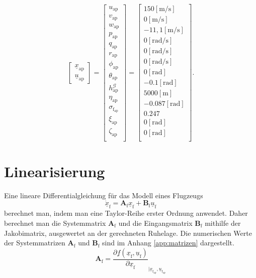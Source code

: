 \begin{equation}
\begin{bmatrix}
\underline{x}_\mathrm{ap} \\ \underline{u}_\mathrm{ap} 
\end{bmatrix} = 
\begin{bmatrix} 
u_\mathrm{ap}\\v_\mathrm{ap}\\w_\mathrm{ap}\\p_\mathrm{ap}\\q_\mathrm{ap}\\r_\mathrm{ap}\\\phi_\mathrm{ap}\\\theta_\mathrm{ap}\\h^\mathcal{G}_\mathrm{ap}\\ \eta_\mathrm{ap}\\ \sigma_{\mathrm{f_{ap}}}\\ \xi_\mathrm{ap} \\ \zeta_\mathrm{ap}\\
\end{bmatrix} =  \begin{bmatrix} 
150 \mathrm{ [m/s]}\\0 \mathrm{[ m/s]}\\-11,1 \mathrm{[m/s]}\\0 \mathrm{[ rad/s]}\\0 \mathrm{ [rad/s]}\\0 \mathrm{ [rad/s]}\\0 \mathrm{ [rad]}\\-0.1 \mathrm{[ rad]}\\5000 \mathrm{[ m]}\\-0.087 \mathrm{[ rad]}\\0.247 \\0 \mathrm{[ rad]}\\0 \mathrm{[ rad]}\\
\end{bmatrix}.
\end{equation}


\section{Linearisierung}
Eine lineare Differentialgleichung für das Modell eines Flugzeugs
\begin{equation}
\underline{\dot{x}}_\mathrm{f} = \textbf{A}_\mathrm{f}\underline{x}_\mathrm{f} + \textbf{B}_\mathrm{f}\underline{u}_\mathrm{f}
\end{equation}
berechnet man, indem man eine Taylor-Reihe erster Ordnung anwendet. Daher berechnet man die Systemmatrix $\textbf{A}_\mathrm{f}$ und die Eingangsmatrix $\textbf{B}_\mathrm{f}$ mithilfe der Jakobimatrix, ausgewertet an der gerechneten Ruhelage. Die numerischen Werte der Systemmatrizen $\textbf{A}_\mathrm{f}$ und $\textbf{B}_\mathrm{f}$ sind im Anhang \ref{app:matrizen} dargestellt.
\begin{equation}
\textbf{A}_\mathrm{f} = \dfrac{\partial \underline{f}(\underline{x}_\mathrm{f},\underline{u}_\mathrm{f})}{\partial \underline{x}_\mathrm{f}}_{|\underline{x}_\mathrm{f_{ap}},\underline{u}_\mathrm{f_{ap}}} 
\end{equation}


